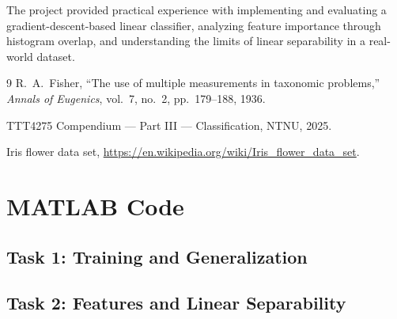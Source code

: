 \documentclass[11pt,a4paper]{article}
\begin{document}
The project provided practical experience with implementing and evaluating a gradient-descent-based linear classifier, analyzing feature importance through histogram overlap, and understanding the limits of linear separability in a real-world dataset.

\begin{thebibliography}{9}
R.~A.~Fisher, ``The use of multiple measurements in taxonomic problems,'' \textit{Annals of Eugenics}, vol.~7, no.~2, pp.~179--188, 1936.

TTT4275 Compendium --- Part III --- Classification, NTNU, 2025.

Iris flower data set, \url{https://en.wikipedia.org/wiki/Iris_flower_data_set}.
\end{thebibliography}

\appendix
\section{MATLAB Code}
\label{app:code}

\subsection{Task 1: Training and Generalization}


\subsection{Task 2: Features and Linear Separability}

\end{document}

